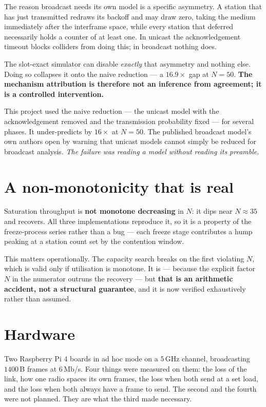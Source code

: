 The reason broadcast needs its own model is a specific asymmetry. A station that has just
transmitted redraws its backoff and may draw zero, taking the medium immediately after the
interframe space, while every station that deferred necessarily holds a counter of at least one. In
unicast the acknowledgement timeout blocks colliders from doing this; in broadcast nothing does.

The slot-exact simulator can disable \emph{exactly} that asymmetry and nothing else. Doing so
collapses it onto the naive reduction --- a $16.9\times$ gap at $N = 50$. \textbf{The mechanism
attribution is therefore not an inference from agreement; it is a controlled intervention.}

\begin{remark}
This project used the naive reduction --- the unicast model with the acknowledgement removed and
the transmission probability fixed --- for several phases. It under-predicts by $16\times$ at
$N = 50$. The published broadcast model's own authors open by warning that unicast models cannot
simply be reduced for broadcast analysis. \emph{The failure was reading a model without reading its
preamble.}
\end{remark}

\section{A non-monotonicity that is real}

Saturation throughput is \textbf{not monotone decreasing} in $N$: it dips near $N \approx 35$ and
recovers. All three implementations reproduce it, so it is a property of the freeze-process series
rather than a bug --- each freeze stage contributes a hump peaking at a station count set by the
contention window.

This matters operationally. The capacity search breaks on the first violating $N$, which is valid
only if utilisation is monotone. It is --- because the explicit factor $N$ in the numerator outruns
the recovery --- but \textbf{that is an arithmetic accident, not a structural guarantee}, and it is
now verified exhaustively rather than assumed.

\section{Hardware}\label{sec:hardware}

Two Raspberry Pi 4 boards in ad hoc mode on a $5$\,GHz channel, broadcasting $1400$\,B frames at
$6$\,Mb/s. Four things were measured on them: the loss of the link, how one radio spaces its
own frames, the loss when both send at a set load, and the loss when both always have a frame
to send. The second and the fourth were not planned. They are what the third made necessary.

